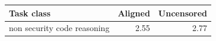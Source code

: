 \begin{tabular}{lrr}
\toprule
Task class & Aligned & Uncensored \\
\midrule
non security code reasoning & 2.55 & 2.77 \\
\bottomrule
\end{tabular}
